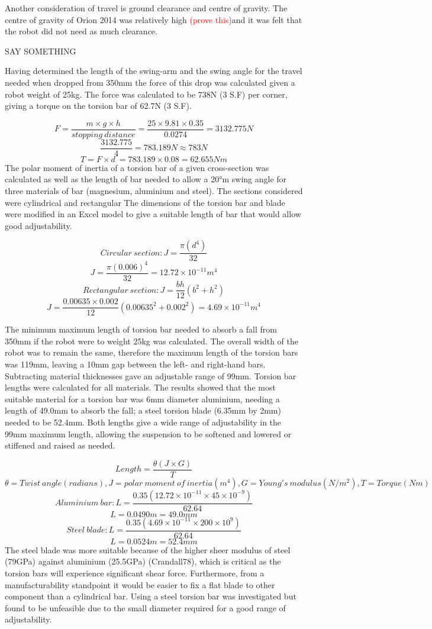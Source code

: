Another consideration of travel is ground clearance and centre of gravity. The centre of gravity of Orion 2014 was relatively high \textcolor{red}{(prove this)}and it was felt that the robot did not need as much clearance.\par SAY SOMETHING

Having determined the length of the swing-arm and the swing angle for the travel needed when dropped from 350mm the force of this drop was calculated given a robot weight of 25kg. The force was calculated to be 738N (3 S.F) per corner, giving a torque on the torsion bar of 62.7N (3 S.F).\par
\[ F = \frac{m \times g \times h}{stopping\:distance} = \frac{25 \times 9.81 \times 0.35}{0.0274} = 3132.775N\]
\[\frac{3132.775}{4} = 783.189N \approx 783N\]
\[ T = F \times d\ = 783.189 \times 0.08 = 62.655Nm\]
The polar moment of inertia of a torsion bar of a given cross-section was calculated as well as the length of bar needed to allow a 20°m swing angle for three materials of bar (magnesium, aluminium and steel). The sections considered were cylindrical and rectangular The dimensions of the torsion bar and blade were modified in an Excel model to give a suitable length of bar that would allow good adjustability. 

\[ Circular\:section: J = \frac{\pi(d^4)}{32} \]
\[J = \frac{\pi(0.006)^4}{32} = 12.72\times 10^{-11}m^4\]
\[Rectangular\: section: J = \frac{bh}{12}(b^2 + h^2)\]
\[J = \frac{0.00635\times0.002}{12}(0.00635^2 + 0.002^2) = 4.69\times10^{-11}m^4\]

The minimum maximum length of torsion bar needed to absorb a fall from 350mm if the robot were to weight 25kg was calculated. The overall width of the robot was to remain the same, therefore the maximum length of the torsion bars was 119mm, leaving a 10mm gap between the left- and right-hand bars. Subtracting material thicknesses gave an adjustable range of 99mm. Torsion bar lengths were calculated for all materials. The results showed that the most suitable material for a torsion bar was 6mm diameter aluminium, needing a length of 49.0mm to absorb the fall; a steel torsion blade (6.35mm by 2mm) needed to be 52.4mm. Both lengths give a wide range of adjustability in the 99mm maximum length, allowing the suspension to be softened and lowered or stiffened and raised as needed.\par

\[Length = \frac{\theta(J \times G)}{T}\]\[\theta = Twist\:angle (radians), J = polar\:moment\:of\:inertia (m^4), G = Young's\:modulus (N/m^2), T = Torque (Nm)\]
\[Aluminium\:bar: L = \frac{0.35(12.72\times 10^{-11} \times 45 \times 10^{-9})}{62.64}\]
\[L = 0.0490m = 49.0mm\]
\[Steel\:blade: L = \frac{0.35(4.69\times10^{-11} \times 200 \times 10^{9})}{62.64}\]
\[L = 0.0524m = 52.4mm\]
The steel blade was more suitable because of the higher sheer modulus of steel (79GPa) against aluminium (25.5GPa) (Crandall78), which is critical as the torsion bars will experience significant shear force. Furthermore, from a manufacturability standpoint it would be easier to fix a flat blade to other component than a cylindrical bar. Using a steel torsion bar was investigated but found to be unfeasible due to the small diameter required for a good range of adjustability.

